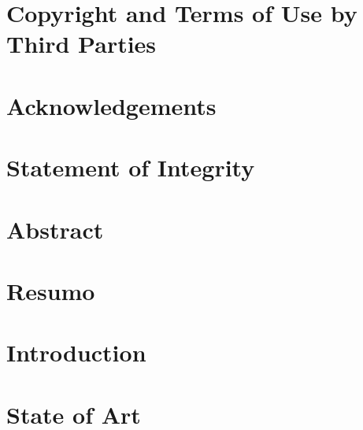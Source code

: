 \documentclass[a4paper,11pt]{article}
\begin{document}
    




\pagebreak






\setcounter{secnumdepth}{-1}



\section*{Copyright and Terms of Use by Third Parties}


\section*{Acknowledgements}


\section*{Statement of Integrity}


\section*{Abstract}

\pagebreak

\section*{Resumo}

\pagebreak

\renewcommand{\contentsname}{Contents}        %
\tableofcontents
\newpage

\listoffigures
\newpage

\listoftables
\newpage




\setcounter{secnumdepth}{3}
\pagebreak


\section{Introduction}





\section{State of Art}
\end{document}
